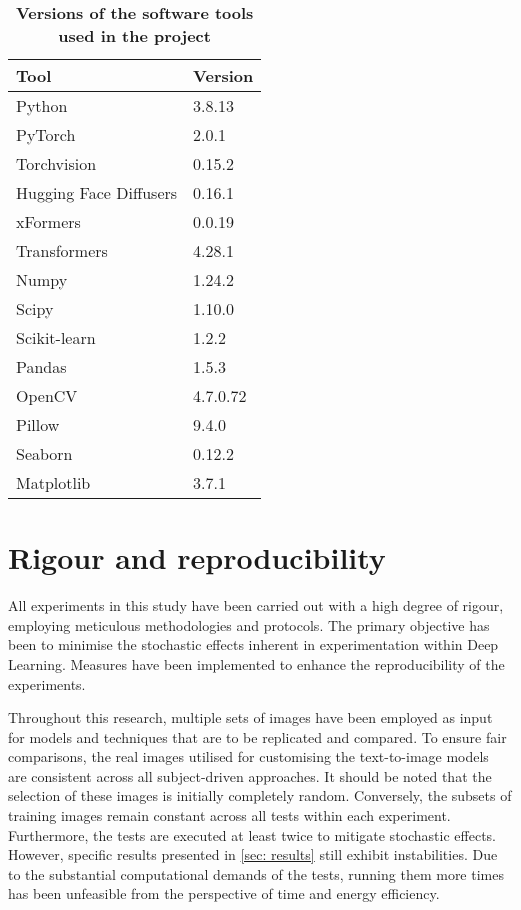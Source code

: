 \begin{table}[ht]
\centering
\begin{tabular}{|l|l|}
\hline
\rowcolor[HTML]{BFBFBF} 
\textbf{Tool} & \textbf{Version} \\ \hline
\rowcolor[HTML]{FFFFFF} 
Python & 3.8.13 \\ \hline
\rowcolor[HTML]{FFFFFF} 
PyTorch & 2.0.1 \\ \hline
\rowcolor[HTML]{FFFFFF} 
Torchvision & 0.15.2 \\ \hline
\rowcolor[HTML]{FFFFFF} 
Hugging Face Diffusers & 0.16.1 \\ \hline
\rowcolor[HTML]{FFFFFF} 
xFormers & 0.0.19 \\ \hline
\rowcolor[HTML]{FFFFFF} 
Transformers & 4.28.1 \\ \hline
\rowcolor[HTML]{FFFFFF} 
Numpy & 1.24.2 \\ \hline
\rowcolor[HTML]{FFFFFF} 
Scipy & 1.10.0 \\ \hline
\rowcolor[HTML]{FFFFFF} 
Scikit-learn & 1.2.2 \\ \hline
\rowcolor[HTML]{FFFFFF} 
Pandas & 1.5.3 \\ \hline
\rowcolor[HTML]{FFFFFF} 
OpenCV & 4.7.0.72 \\ \hline
\rowcolor[HTML]{FFFFFF} 
Pillow & 9.4.0 \\ \hline
\rowcolor[HTML]{FFFFFF} 
Seaborn & 0.12.2 \\ \hline
\rowcolor[HTML]{FFFFFF} 
Matplotlib & 3.7.1 \\ \hline
\end{tabular}
\caption{\textbf{Versions of the software tools used in the project}}
\label{table:TableHSoftware}
\end{table}

\chapter{Rigour and reproducibility} \label{rigour}

All experiments in this study have been carried out with a high degree of rigour, employing meticulous methodologies and protocols. The primary objective has been to minimise the stochastic effects inherent in experimentation within Deep Learning. Measures have been implemented to enhance the reproducibility of the experiments.

Throughout this research, multiple sets of images have been employed as input for models and techniques that are to be replicated and compared. To ensure fair comparisons, the real images utilised for customising the text-to-image models are consistent across all subject-driven approaches. It should be noted that the selection of these images is initially completely random. Conversely, the subsets of training images remain constant across all tests within each experiment. Furthermore, the tests are executed at least twice to mitigate stochastic effects. However, specific results presented in \ref{sec: results} still exhibit instabilities. Due to the substantial computational demands of the tests, running them more times has been unfeasible from the perspective of time and energy efficiency.

